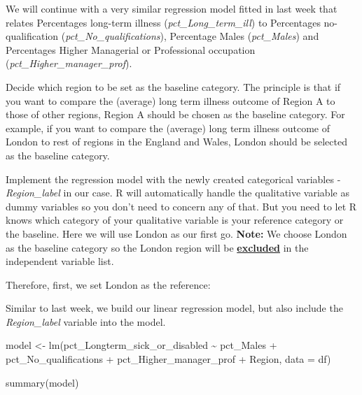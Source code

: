 \documentclass[
  letterpaper,
  DIV=11,
  numbers=noendperiod]{scrreprt}
\newenvironment{Shaded}{\begin{snugshade}}{\end{snugshade}}
\newcommand{\AttributeTok}[1]{\textcolor[rgb]{0.40,0.45,0.13}{#1}}
\newcommand{\FunctionTok}[1]{\textcolor[rgb]{0.28,0.35,0.67}{#1}}
\newcommand{\NormalTok}[1]{\textcolor[rgb]{0.00,0.23,0.31}{#1}}
\newcommand{\OtherTok}[1]{\textcolor[rgb]{0.00,0.23,0.31}{#1}}
\newcommand{\SpecialCharTok}[1]{\textcolor[rgb]{0.37,0.37,0.37}{#1}}
\newcommand{\StringTok}[1]{\textcolor[rgb]{0.13,0.47,0.30}{#1}}
\begin{document}
We will continue with a very similar regression model fitted in last
week that relates Percentages long-term illness
(\emph{pct\_Long\_term\_ill}) to Percentages no-qualification
(\emph{pct\_No\_qualifications}), Percentage Males (\emph{pct\_Males})
and Percentages Higher Managerial or Professional occupation
(\emph{pct\_Higher\_manager\_prof}).

Decide which region to be set as the baseline category. The principle is
that if you want to compare the (average) long term illness outcome of
Region A to those of other regions, Region A should be chosen as the
baseline category. For example, if you want to compare the (average)
long term illness outcome of London to rest of regions in the England
and Wales, London should be selected as the baseline category.

Implement the regression model with the newly created categorical
variables - \emph{Region\_label} in our case. R will automatically
handle the qualitative variable as dummy variables so you don't need to
concern any of that. But you need to let R knows which category of your
qualitative variable is your reference category or the baseline. Here we
will use London as our first go. \textbf{Note:} We choose London as the
baseline category so the London region will be \ul{\textbf{excluded}} in
the independent variable list.

Therefore, first, we set London as the reference:

\begin{Shaded}
\end{Shaded}

Similar to last week, we build our linear regression model, but also
include the \emph{Region\_label} variable into the model.

\begin{Shaded}
\begin{Highlighting}[]
\NormalTok{model }\OtherTok{\textless{}{-}} \FunctionTok{lm}\NormalTok{(pct\_Longterm\_sick\_or\_disabled }\SpecialCharTok{\textasciitilde{}}\NormalTok{ pct\_Males }\SpecialCharTok{+}\NormalTok{ pct\_No\_qualifications }\SpecialCharTok{+}\NormalTok{ pct\_Higher\_manager\_prof }\SpecialCharTok{+}\NormalTok{ Region, }\AttributeTok{data =}\NormalTok{ df)}

\FunctionTok{summary}\NormalTok{(model)}
\end{Highlighting}
\end{Shaded}
\end{document}
